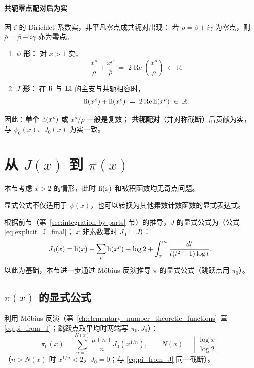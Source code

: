 \paragraph{共轭零点配对后为实}
因 $\zeta$ 的 Dirichlet 系数实，非平凡零点成共轭对出现：
若 $\rho=\beta+i\gamma$ 为零点，则 $\bar\rho=\beta-i\gamma$ 亦为零点。
\begin{enumerate}
  \item \textbf{$\psi$ 形：}
    对 $x>1$ 实，
    \[
      \frac{x^{\rho}}{\rho}+\frac{x^{\bar\rho}}{\bar\rho}
      \;=\;
      2\operatorname{Re}\!\left(\frac{x^{\rho}}{\rho}\right)
      \;\in\;
      \mathbb{R}.
    \]
  \item \textbf{$J$ 形：}
    在 $\operatorname{li}$ 与 $\operatorname{Ei}$ 的主支与共轭相容时，
    \[
      \operatorname{li}(x^{\rho})+\operatorname{li}(x^{\bar\rho})
      \;=\;
      2\operatorname{Re}\operatorname{li}(x^{\rho})
      \;\in\;
      \mathbb{R}.
    \]
\end{enumerate}
因此：\textbf{单个} $\operatorname{li}(x^{\rho})$ 或 $x^{\rho}/\rho$ 一般是复数；
\textbf{共轭配对}（并对称截断）后贡献为实，与 $\psi_0(x)$、$J_0(x)$ 为实一致。


\section{从 \texorpdfstring{$J(x)$}{J(x)} 到 \texorpdfstring{$\pi(x)$}{pi(x)}}\label{sec:psi-to-pi}

本节考虑 $x>2$ 的情形，此时 $\operatorname{li}(x)$ 和被积函数均无奇点问题。

显式公式不仅适用于 $\psi(x)$，也可以转换为其他素数计数函数的显式表达式。

根据前节（第~\ref{sec:integration-by-parts} 节）的推导，$J$ 的显式公式为（公式 \eqref{eq:explicit_J_final}；
$x$ 非素数幂时 $J_0=J$）：
\[
J_0(x)=\operatorname{li}(x)-\sum_{\rho}\operatorname{li}(x^{\rho})-\log 2+\int_x^{\infty}\frac{dt}{t(t^2-1)\log t}.
\]
以此为基础，本节进一步通过 Möbius 反演推导 $\pi$ 的显式公式（跳跃点用 $\pi_0$）。

\subsection{\texorpdfstring{$\pi(x)$}{pi(x)} 的显式公式}\label{sec:explicit-pi}

利用 Möbius 反演（第~\ref{ch:elementary_number_theoretic_functions}~章 \eqref{eq:pi_from_J}；跳跃点取平均时两端写 $\pi_0,J_0$）：
\[
\pi_0(x)=\sum_{n=1}^{N(x)}\frac{\mu(n)}{n}J_0(x^{1/n}),
\qquad N(x)=\left\lfloor\frac{\log x}{\log 2}\right\rfloor
\]
（$n>N(x)$ 时 $x^{1/n}<2$，$J_0=0$；与 \eqref{eq:pi_from_J} 同一截断）。

